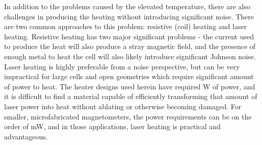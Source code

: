 \documentclass[PaulGanssle-Thesis.tex]{subfiles}
\begin{document}
In addition to the problems caused by the elevated temperature, there are also challenges in producing the heating without introducing significant noise. There are two common approaches to this problem: resistive (coil) heating and laser heating. Resistive heating has two major significant problems - the current used to produce the heat will also produce a stray magnetic field, and the presence of enough metal to heat the cell will also likely introduce significant Johnson noise. Laser heating is highly preferable from a noise perspective, but can be very impractical for large cells and open geometries which require significant amount of power to heat. The heater designs used herein have required \unit[10--20]{W} of power, and it is difficult to find a material capable of efficiently transforming that amount of laser power into heat without ablating or otherwise becoming damaged. For smaller, microfabricated magnetometers, the power requirements can be on the order of \unit[100-200]{mW},\cite{Mhaskar2012,Schwindt2007} and in those applications, laser heating is practical and advantageous.
\end{document}
